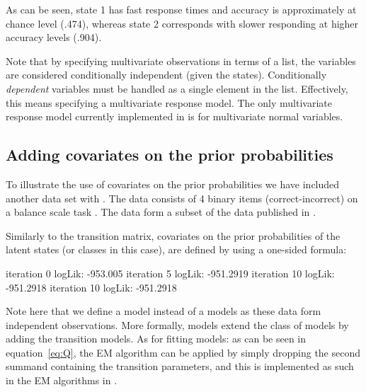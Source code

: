 \documentclass[article]{jss}
\begin{document}
As can be seen, state 1 has fast response times and accuracy is
approximately at chance level (.474), whereas state 2 corresponds with
slower responding at higher accuracy levels (.904).

Note that by specifying multivariate observations in terms of a list,
the variables are considered conditionally independent (given the
states).  Conditionally \emph{dependent} variables must be handled as
a single element in the list.  Effectively, this means specifying a
multivariate response model.  The only multivariate response model
currently implemented in  is for multivariate normal
variables.

\subsection{Adding covariates on the prior probabilities}

To illustrate the use of covariates on the prior probabilities we have
included another data set with .  The 
data consists of 4 binary items (correct-incorrect) on a balance scale
task \citet{Siegler1981}.  The data form a subset of the data
published in \citet{Jansen2002}.

Similarly to the transition matrix, covariates on the prior
probabilities of the latent states (or classes in this case), are
defined by using a one-sided formula:
\begin{Schunk}
\begin{Soutput}
iteration 0 logLik: -953.005 
iteration 5 logLik: -951.2919 
iteration 10 logLik: -951.2918 
iteration 10 logLik: -951.2918 
\end{Soutput}
\end{Schunk}

Note here that we define a  model instead of a 
models as these data form independent observations.  More formally,
 models extend the class of  models by adding
the transition models.  As for fitting  models: as can be
seen in equation~\ref{eq:Q}, the EM algorithm can be applied by simply
dropping the second summand containing the transition parameters, and 
this is implemented as such in the EM algorithms in .
\end{document}
